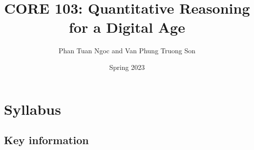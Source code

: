 \documentclass[
]{article}
\title{CORE 103: Quantitative Reasoning for a Digital Age}
\author{Phan Tuan Ngoc and Van Phung Truong Son}
\date{Spring 2023}
\begin{document}
\maketitle

{
\setcounter{tocdepth}{2}
\tableofcontents
}
\hypertarget{syllabus}{%
\section*{Syllabus}\label{syllabus}}

\hypertarget{key-information}{%
\subsection*{Key information}\label{key-information}}
\end{document}
